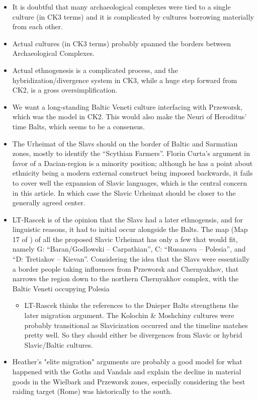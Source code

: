\documentclass{article}
\begin{document}
	\begin{itemize}
		\item It is doubtful that many archaeological complexes were tied to a single culture (in CK3 terms) and it is complicated by cultures borrowing materially from each other.
		\item Actual cultures (in CK3 terms) probably spanned the borders between Archaeological Complexes.
		\item Actual ethnogenesis is a complicated process, and the hybridization/divergence system in CK3, while a huge step forward from CK2, is a gross oversimplification.
		\item We want a long-standing Baltic Veneti culture interfacing with Przeworsk, which was the model in CK2. This would also make the Neuri of Heroditus’ time Balts, which seems to be a consensus.
		\item The Urheimat of the Slavs should on the border of Baltic and Sarmatian zones, mostly to identify the “Scythian Farmers”.
		Florin Curta’s argument in favor of a Dacian-region is a minority position; although he has a point about ethnicity being a modern external construct being imposed backwards, it fails to cover well the expansion of Slavic languages, which is the central concern in this article.
		In which case the Slavic Urheimat should be closer to the generally agreed center.
		\item LT-Rascek is of the opinion that the Slavs had a later ethnogensis, and for linguistic reasons, it had to initial occur alongside the Balts.
		The map (Map 17 of \cite{HeatherEmpiresAndBarbarians}) of all the proposed Slavic Urheimat has only a few that would fit, namely G: “Baran/Godlowski – Carpathian”, C: “Rusanova – Polesia”, and “D: Tretiakov – Kievan”.
		Considering the idea that the Slavs were essentially a border people taking influences from Przeworsk and Chernyakhov, that narrows the region down to the northern Chernyakhov complex, with the Baltic Veneti occupying Polesia
		\begin{itemize}
			\item LT-Rascek thinks the references to the Dnieper Balts strengthens the later migration argument.
			The Kolochin \& Moshchiny cultures were probably transitional as Slavicization occurred and the timeline matches pretty well. So they should either be divergences from Slavic or hybrid Slavic/Baltic cultures.
		\end{itemize}
		\item Heather's "elite migration" arguments are probably a good model for what happened with the Goths and Vandals and explain the decline in material goods in the Wielbark and Przeworsk zones, especially considering the best raiding target (Rome) was historically to the south.

\end{itemize}
\end{document}
